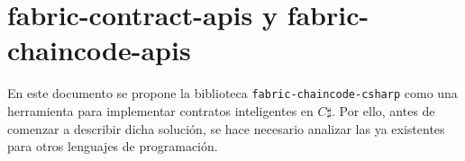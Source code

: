 %
%
%
%





%
%



\section{fabric-contract-apis y fabric-chaincode-apis}
En este documento se propone la biblioteca \texttt{fabric-chaincode-csharp} como una herramienta para implementar contratos inteligentes en $ C\sharp $. Por ello, antes de comenzar a describir dicha solución, se hace necesario analizar las ya existentes para otros lenguajes de programación.

